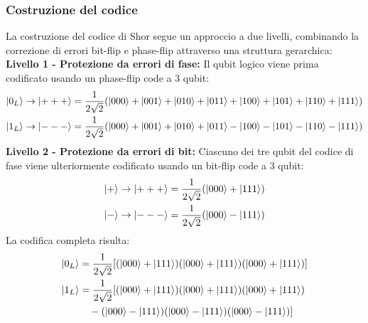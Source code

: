 \documentclass[a4paper,12pt]{report}
\theoremstyle{plain}
\begin{document}
\subsubsection{Costruzione del codice}
La costruzione del codice di Shor segue un approccio a due livelli, combinando la correzione di errori bit-flip e phase-flip attraverso una struttura gerarchica:
\textbf{Livello 1 - Protezione da errori di fase:}
Il qubit logico viene prima codificato usando un phase-flip code a 3 qubit:
\begin{align}
\ket{0_L} &\rightarrow \ket{+++} = \frac{1}{2\sqrt{2}}(\ket{000} + \ket{001} + \ket{010} + \ket{011} + \ket{100} + \ket{101} + \ket{110} + \ket{111}) \\
\ket{1_L} &\rightarrow \ket{---} = \frac{1}{2\sqrt{2}}(\ket{000} + \ket{001} + \ket{010} + \ket{011} - \ket{100} - \ket{101} - \ket{110} - \ket{111})
\end{align}
\textbf{Livello 2 - Protezione da errori di bit:}
Ciascuno dei tre qubit del codice di fase viene ulteriormente codificato usando un bit-flip code a 3 qubit:
\begin{align}
\ket{+} &\rightarrow \ket{+++} = \frac{1}{2\sqrt{2}}(\ket{000} + \ket{111}) \\
\ket{-} &\rightarrow \ket{---} = \frac{1}{2\sqrt{2}}(\ket{000} - \ket{111})
\end{align}
La codifica completa risulta:
\begin{align}
\ket{0_L} &= \frac{1}{2\sqrt{2}}[(\ket{000} + \ket{111})(\ket{000} + \ket{111})(\ket{000} + \ket{111})] \\
\ket{1_L} &= \frac{1}{2\sqrt{2}}[(\ket{000} + \ket{111})(\ket{000} + \ket{111})(\ket{000} + \ket{111}) \\
&\quad - (\ket{000} - \ket{111})(\ket{000} - \ket{111})(\ket{000} - \ket{111})]
\end{align}
\end{document}
